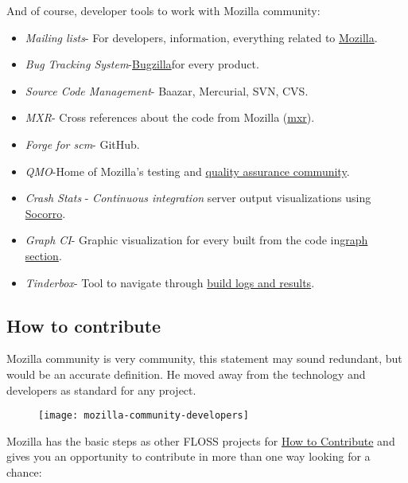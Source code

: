 And of course, developer tools to work with Mozilla community:

\begin{itemize}
	\item \textit{Mailing lists}- For developers, information, everything related to \href{https://lists.mozilla.org/listinfo}{Mozilla}.
	\item \textit{Bug Tracking System}-\href{https://bugzilla.mozilla.org/}{Bugzilla}for every product.
	\item \textit{Source Code Management}- Baazar, Mercurial, SVN, CVS.
	\item \textit{MXR}- Cross references about the code from Mozilla (\href{http://mxr.mozilla.org/}{mxr}).
	\item \textit{Forge for scm}- GitHub.
	\item \textit{QMO}-Home of Mozilla's testing and \href{http://quality.mozilla.org/}{quality assurance community}.
	\item \textit{Crash Stats} - \emph{Continuous integration} server output visualizations using \href{https://github.com/mozilla/socorro}{Socorro}.
	\item \textit{Graph CI}- Graphic visualization for every built from the code in\href{http://graphs.mozilla.org/}{graph section}.
	\item \textit{Tinderbox}- Tool to navigate through \href{http://tinderbox.mozilla.org/showbuilds.cgi}{build logs and results}.
\end{itemize}

\subsection{How to contribute}

\par Mozilla community is very community, this statement may sound redundant, but would be an accurate definition. He moved away from the technology and developers as standard for any project.

\begin{figure}[H]
    \centering
    \texttt{[image: mozilla-community-developers]}
    \caption{}
    \label{community-dev}
\end{figure}

\par Mozilla has the basic steps as other FLOSS projects for \href{http://www.mozilla.org/es-ES/contribute/}{How to Contribute} and gives you an opportunity to contribute in more than one way looking for a chance:


